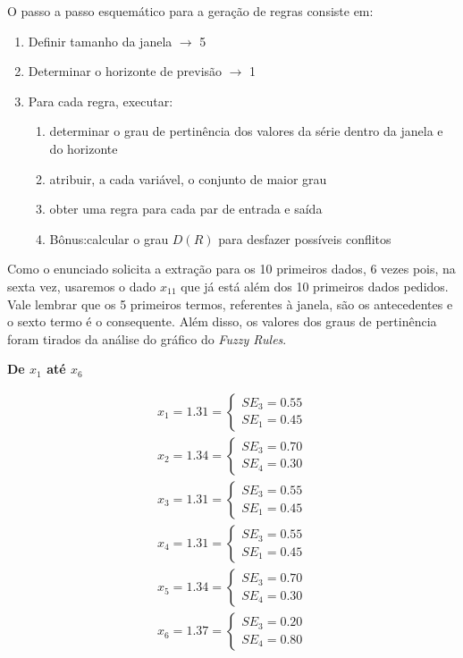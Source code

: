 \documentclass[12pt]{article}
\begin{document}
O passo a passo esquemático para a geração de regras consiste em:
\begin{enumerate}
	\item Definir tamanho da janela $\to$ 5
	\item Determinar o horizonte de previsão $\to$ 1
	\item Para cada regra, executar:
	\begin{enumerate}
		\item determinar o grau de pertinência dos valores da série dentro da janela e do horizonte
		\item atribuir, a cada variável, o conjunto de maior grau
		\item obter uma regra para cada par de entrada e saída
		\item Bônus:calcular o grau $D(R)$ para desfazer possíveis conflitos 
	\end{enumerate}
\end{enumerate} 

Como o enunciado solicita a extração para os 10 primeiros dados, 6 vezes pois, na sexta vez, usaremos o dado $x_{11}$ que já está além dos 10 primeiros dados pedidos. Vale lembrar que os 5 primeiros termos, referentes à janela, são os antecedentes e o sexto termo é o consequente. Além disso, os valores dos graus de pertinência foram tirados da análise do gráfico do \textit{Fuzzy Rules}.

\textbf{De $x_1$ até $x_6$}

\begin{align*}
	x_1=1.31=\begin{cases}
		SE_3=0.55\\SE_1=0.45
	\end{cases}\\
	x_2=1.34=\begin{cases}
		SE_3=0.70\\SE_4=0.30
	\end{cases}\\
	x_3=1.31=\begin{cases}
		SE_3=0.55\\SE_1=0.45
	\end{cases}\\
	x_4=1.31=\begin{cases}
		SE_3=0.55\\SE_1=0.45
	\end{cases}\\
	x_5=1.34=\begin{cases}
		SE_3=0.70\\SE_4=0.30
	\end{cases}\\
	x_6=1.37=\begin{cases}
		SE_3=0.20\\SE_4=0.80
	\end{cases}
\end{align*}
\end{document}
